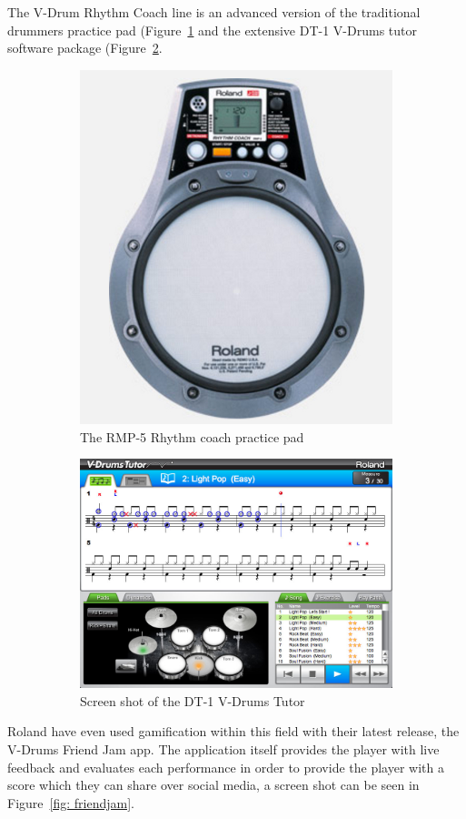 \documentclass[a4paper, 11pt]{article}
\begin{document}
The V-Drum Rhythm Coach line is an advanced version of the traditional drummers practice pad (Figure~\ref{fig: rmp-5} and the extensive DT-1 V-Drums tutor software package (Figure~\ref{fig: dt-1}. 
\begin{figure}[ht]
\centering
\begin{subfigure}{.5\textwidth}
  \centering
  \includegraphics[width=0.5\linewidth]{images/rmp-5.jpg}
  \caption{The RMP-5 Rhythm coach practice pad}
  \label{fig: rmp-5}
\end{subfigure}%
\begin{subfigure}{.5\textwidth}
  \centering
  \includegraphics[width=0.75\linewidth]{images/dt-1_ss_main_notation_gal.jpg}
  \caption{Screen shot of the DT-1 V-Drums Tutor}
  \label{fig: dt-1}
\end{subfigure}
\caption{}
\label{fig: roland systems}
\end{figure}
Roland have even used gamification within this field with their latest release, the V-Drums Friend Jam app. The application itself provides the player with live feedback and evaluates each performance in order to provide the player with a score which they can share over social media, a screen shot can be seen in Figure~\ref{fig: friendjam}. \par
\end{document}

